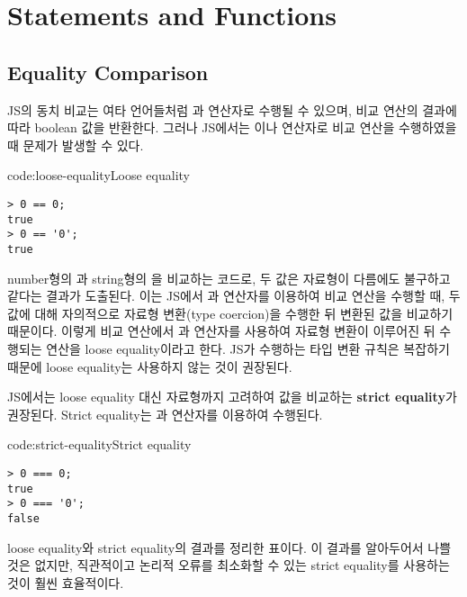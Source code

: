 \section{Statements and Functions}\label{sect:statements-and-functions}

\subsection*{Equality Comparison}

JS의 동치 비교는 여타 언어들처럼 \cd{==}과 \cd{!=} 연산자로 수행될 수 있으며, 비교 연산의 결과에 따라 boolean 값을 반환한다. 그러나 JS에서는 \cd{==}이나 \cd{!=} 연산자로 비교 연산을 수행하였을 때 문제가 발생할 수 있다.

\begin{codeenv}{code:loose-equality}{Loose equality}\begin{verbatim}
> 0 == 0;
true
> 0 == '0';
true
\end{verbatim}
\end{codeenv}

\는 number형의 과 string형의 을 비교하는 코드로, 두 값은 자료형이 다름에도 불구하고 같다는 결과가 도출된다. 이는 JS에서 \cd{==}과 \cd{!=} 연산자를 이용하여 비교 연산을 수행할 때, 두 값에 대해 자의적으로 자료형 변환(type coercion)을 수행한 뒤 변환된 값을 비교하기 때문이다. 이렇게 비교 연산에서 \cd{==}과 \cd{!=} 연산자를 사용하여 자료형 변환이 이루어진 뒤 수행되는 연산을 loose equality이라고 한다. JS가 수행하는 타입 변환 규칙은 복잡하기 때문에 loose equality는 사용하지 않는 것이 권장된다.


JS에서는 loose equality 대신 자료형까지 고려하여 값을 비교하는 \textbf{strict equality}가 권장된다. Strict equality는 \cd{===}과 \cd{!==} 연산자를 이용하여 수행된다.

\begin{codeenv}{code:strict-equality}{Strict equality}\begin{verbatim}
> 0 === 0;
true
> 0 === '0';
false
\end{verbatim}
\end{codeenv}

\은 loose equality와 strict equality의 결과를 정리한 표이다. 이 결과를 알아두어서 나쁠 것은 없지만, 직관적이고 논리적 오류를 최소화할 수 있는 strict equality를 사용하는 것이 훨씬 효율적이다.

